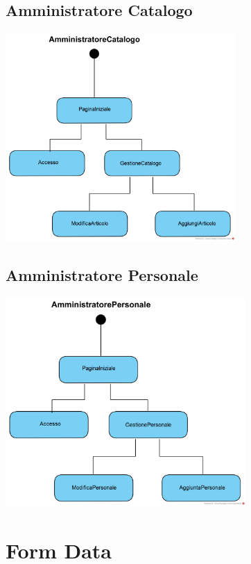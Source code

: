 \documentclass[12pt]{article}
\begin{document}
\subsection{Amministratore Catalogo}
\begin{center}
\includegraphics[height=300px]{NavigationalPath/AmministratoreCatalogo}
\end{center}

\subsection{Amministratore Personale}
\begin{center}
\includegraphics[height=300px]{NavigationalPath/AmministratorePersonale}
\end{center}

\newpage


\section{Form Data}
 
\end{document}
